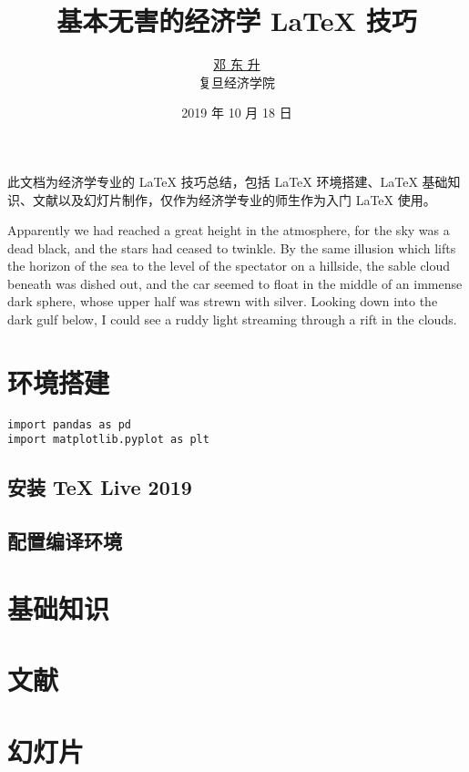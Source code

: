 \documentclass[11pt]{article}
\title{\bfseries 基本无害的经济学 \LaTeX{} 技巧}
\author{\href{https://ddswhu.me/}{邓 东 升} \\  复旦经济学院}
\date{2019 年 10 月 18 日}
\begin{document}
\maketitle

此文档为经济学专业的 \LaTeX{} 技巧总结，包括 \LaTeX{} 环境搭建、\LaTeX{} 基础知识、文献以及幻灯片制作，仅作为经济学专业的师生作为入门 \LaTeX{} 使用。 

Apparently we had reached a great height in the atmosphere, for the sky was a dead black, and the stars had ceased to twinkle. By the same illusion which lifts the horizon of the sea to the level of the spectator on a hillside, the sable cloud beneath was dished out, and the car seemed to float in the middle of an immense dark sphere, whose upper half was strewn with silver. Looking down into the dark gulf below, I could see a ruddy light streaming through a rift in the clouds.

\section{环境搭建}

\begin{verbatim}
import pandas as pd
import matplotlib.pyplot as plt
\end{verbatim}

\subsection{安装 \TeX{} Live 2019}

\subsection{配置编译环境}

\section{基础知识}

\section{文献}

\section{幻灯片}
\end{document}
